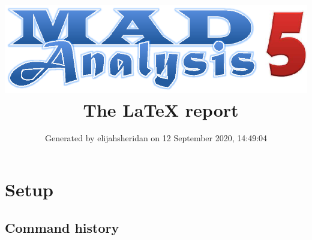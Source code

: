 \documentclass[a4paper, 10pt]{article}
\title{{\includegraphics[scale=.4]{logo.eps}}\ The LaTeX report}
\author{Generated by elijahsheridan on 12 September 2020, 14:49:04}
\begin{document}
\maketitle
\flushbottom

\newpage
\section{ Setup}

\subsection{ Command history}
\end{document}
